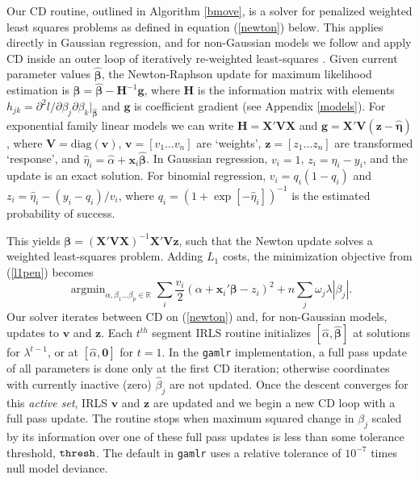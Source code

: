 \documentclass[12pt]{article}
\newcommand{\bs}[1]{\boldsymbol{#1}}
\newcommand{\mr}[1]{\mathrm{#1}}
\newcommand{\bm}[1]{\mathbf{#1}}
\newcommand{\ds}[1]{\mathds{#1}}
\DeclareMathOperator*{\argmin}{argmin}
\begin{document}
Our CD routine, outlined in Algorithm \ref{bmove}, is a solver for penalized
weighted least squares problems as defined in equation (\ref{newton}) below.
This applies directly in Gaussian regression, and for non-Gaussian models  we
follow \citet{friedman_regularization_2010} and apply CD inside an outer loop
of iteratively re-weighted least-squares \citep[IRLS;
e.g.,][]{green_iteratively_1984}. Given current parameter values
$\bs{\hat\beta}$, the Newton-Raphson update for maximum likelihood estimation
is $\bs{\beta} = \bs{\hat\beta} - \bm{H}^{-1}\bm{g}$, where $\bm{H}$ is the
information matrix with elements $h_{jk} = \partial^2 l/\partial
\beta_j\partial \beta_k |_{\bs{\hat\beta}}$ and $\bm{g}$ is coefficient
gradient (see Appendix \ref{models}). For exponential family linear models we
can write $\bm{H} = \bm{X}'\bm{V}\bm{X}$ and $\bm{g} = \bm{X}'\bm{V}(\bm{z} -
\bs{\hat\eta})$, where $\bm{V} = \mr{diag}(\bm{v})$, $\bm{v} = [v_1\ldots
v_n]$ are `weights', $\bm{z} = [z_1\ldots z_n]$ are transformed `response',
and $\hat\eta_i = \hat\alpha + \bm{x}_i\bs{\hat\beta}$.  In Gaussian
regression,  $v_i = 1$, $z_i=\hat\eta_i - y_i$, and the update is an exact
solution. For binomial regression, $v_i = q_i(1-q_i)$ and $z_i = \hat\eta_i -
(y_i-q_i)/v_i$, where $q_i = (1 + \exp[-\hat\eta_i])^{-1}$ is the  estimated
probability of success.

This yields $\bs{\beta} = (\bm{X}'\bm{V}\bm{X})^{-1}\bm{X}'\bm{V}\bm{z}$, such
that the Newton update solves a weighted least-squares problem.   Adding $L_1$
costs,  the minimization objective from (\ref{l1pen}) becomes
\begin{equation} \label{newton}  \argmin_{\alpha,\beta_1 \ldots \beta_p \in
\ds{R}} \sum_i \frac{v_i}{2}(\alpha + \bm{x}_i'\bs{\beta} - z_i)^2  + n\sum_j \omega_j
\lambda |\beta_j|. \end{equation} Our solver iterates between CD on
(\ref{newton}) and,  for non-Gaussian models, updates to $\bm{v}$ and
$\bm{z}$. Each $t^{th}$ segment IRLS routine initializes $[\hat \alpha,
\bs{\hat \beta}]$ at solutions for $\lambda^{t-1}$, or at $[\hat \alpha,
\bm{0}]$ for $t=1$.  In the {\tt gamlr} implementation, a full pass update of
all parameters is done only at the first CD iteration; otherwise coordinates
with currently inactive (zero) $\hat\beta_j$ are not updated. Once the descent
converges for this {\it active set}, IRLS $\bm{v}$ and $\bm{z}$ are updated
and we begin a new CD loop with a full pass update.  The routine stops when
maximum squared change in $\beta_j$ scaled by its information over one of
these full pass updates is less than some tolerance threshold, ${\tt thresh}$.
The default in {\tt gamlr} uses a relative tolerance of $10^{-7}$ times null
model deviance.  
\end{document}

